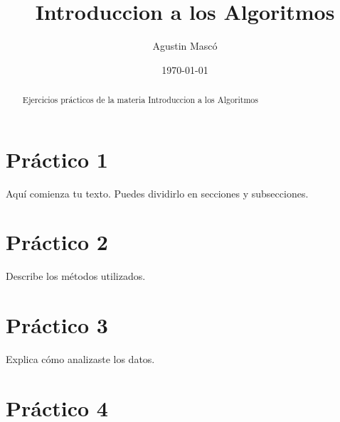 \documentclass[12pt]{article} %
\title{Introduccion a los Algoritmos}
\author{Agustin Mascó}
\date{\today}
\begin{document}
\maketitle 


\begin{abstract}
Ejercicios prácticos de la materia Introduccion a los Algoritmos
\end{abstract}

\pagebreak

\section{Práctico 1}
Aquí comienza tu texto. Puedes dividirlo en secciones y subsecciones.

\section{Práctico 2}
Describe los métodos utilizados.

\section{Práctico 3}
Explica cómo analizaste los datos.

\section{Práctico 4}
\end{document}
